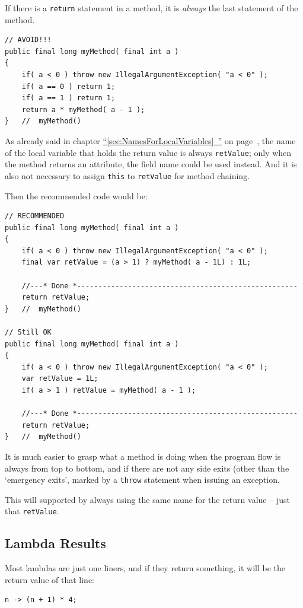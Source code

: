 \documentclass[11pt,a4paper, titlepage, parskip=half, headsepline, footsepline, cleardoublepage=current, headheight=1cm]{scrbook}
\newcommand*{\tqfullvref}[1]{\hyperref[{#1}]{“\ref*{#1}~\nameref*{#1}”} on page~\pageref{#1}}
\begin{document}
If there is a \lstinline|return| statement in a method, it is \textit{always} the last statement of the method.

\begin{lstlisting}
// AVOID!!!
public final long myMethod( final int a )
{
    if( a < 0 ) throw new IllegalArgumentException( "a < 0" );
    if( a == 0 ) return 1;
    if( a == 1 ) return 1;
    return a * myMethod( a - 1 );
}   //  myMethod()
\end{lstlisting}

As already said in chapter \tqfullvref{sec:NamesForLocalVariables}, the name of the local variable that holds the return value is always \lstinline|retValue|; only when the method returns an attribute, the field name could be used instead. And it is also not necessary to assign \lstinline|this| to \lstinline|retValue| for method chaining. 

Then the recommended code would be:
\begin{lstlisting}
// RECOMMENDED
public final long myMethod( final int a )
{
    if( a < 0 ) throw new IllegalArgumentException( "a < 0" );
    final var retValue = (a > 1) ? myMethod( a - 1L) : 1L;
    
    //---* Done *----------------------------------------------------
    return retValue;
}   //  myMethod()

// Still OK
public final long myMethod( final int a )
{
    if( a < 0 ) throw new IllegalArgumentException( "a < 0" );
    var retValue = 1L;
    if( a > 1 ) retValue = myMethod( a - 1 );
    
    //---* Done *----------------------------------------------------
    return retValue;
}   //  myMethod()
\end{lstlisting}

It is much easier to grasp what a method is doing when the program flow is always from top to bottom, and if there are not any side exits (other than the ‘emergency exits’, marked by a \lstinline|throw| statement when issuing an exception.

This will supported by always using the same name for the return value – just that \lstinline|retValue|.

\subsection{Lambda Results}\label{sec:LambdaResults}
Most lambdas are just one liners, and if they return something, it will be the return value of that line:
\begin{lstlisting}
n -> (n + 1) * 4; 
\end{lstlisting}
\end{document}
